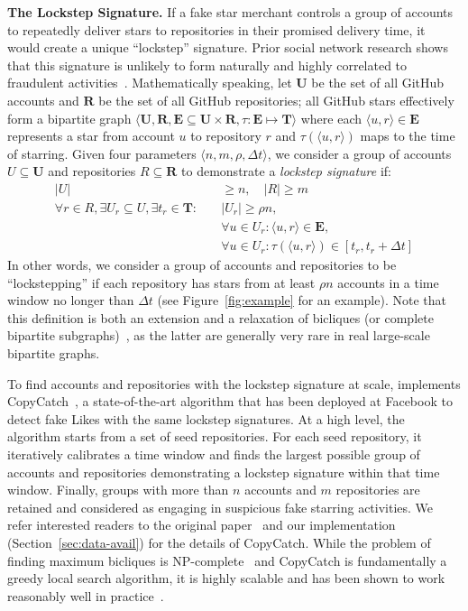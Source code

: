 \textbf{The Lockstep Signature.}
If a fake star merchant controls a group of accounts to repeatedly deliver stars to repositories in their promised delivery time, it would create a unique ``lockstep'' signature.
Prior social network research shows that this signature is unlikely to form naturally and highly correlated to fraudulent activities~\cite{DBLP:conf/www/PanditCWF07, DBLP:conf/www/BeutelXGPF13, DBLP:conf/kdd/HooiSBSSF16}.
Mathematically speaking, let $\mathbf{U}$ be the set of all GitHub accounts and $\mathbf{R}$ be the set of all GitHub repositories; all GitHub stars effectively form a bipartite graph $\langle \mathbf{U}, \mathbf{R}, \mathbf{E} \subseteq \mathbf{U} \times \mathbf{R}, \tau: \mathbf{E}\mapsto \mathbf{T}\rangle$ where each $\langle u, r \rangle \in \mathbf{E} $ represents a star from account $u$ to repository $r$ and $\tau(\langle u, r \rangle)$ maps to the time of starring.
Given four parameters $\langle n, m, \rho, \Delta t\rangle$, we consider a group of accounts $U\subseteq\mathbf{U}$ and repositories $R\subseteq\mathbf{R}$ to demonstrate a \emph{lockstep signature} if:
\begin{align*}
|U| &\geq n, \quad |R| \geq m \\
\forall r \in R, \exists U_r \subseteq U, \exists t_r \in \mathbf{T}: \quad &|U_r| \geq \rho n,\\
&\forall u \in U_r: \langle u, r \rangle \in \mathbf{E},\\ 
&\forall u \in U_r: \tau(\langle u, r \rangle) \in [t_r, t_r + \Delta t]
\end{align*}
In other words,  we consider a group of accounts and repositories to be ``lockstepping'' if each repository has stars from at least $\rho n$ accounts in a time window no longer than $\Delta t$ (see Figure~\ref{fig:example} for an example). 
Note that this definition is both an extension and a relaxation of bicliques (or complete bipartite subgraphs)~\cite{DBLP:journals/dam/Peeters03}, as the latter are generally very rare in real large-scale bipartite graphs.

To find accounts and repositories with the lockstep signature at scale, \SystemName implements \textsf{CopyCatch}~\cite{DBLP:conf/www/BeutelXGPF13}, a state-of-the-art algorithm that has been deployed at Facebook to detect fake Likes with the same lockstep signatures.
At a high level, the algorithm starts from a set of seed repositories.
For each seed repository, it iteratively calibrates a time window and finds the largest possible group of accounts and repositories demonstrating a lockstep signature within that time window.
Finally, groups with more than $n$ accounts and $m$ repositories are retained and considered as engaging in suspicious fake starring activities.
We refer interested readers to the original paper~\cite{DBLP:conf/www/BeutelXGPF13} and our implementation (Section~\ref{sec:data-avail}) for the details of \textsf{CopyCatch}.
While the problem of finding maximum bicliques is NP-complete~\cite{DBLP:journals/dam/Peeters03} and \textsf{CopyCatch} is fundamentally a greedy local search algorithm, it is highly scalable and has been shown to work reasonably well in practice~\cite{DBLP:conf/www/BeutelXGPF13}.

